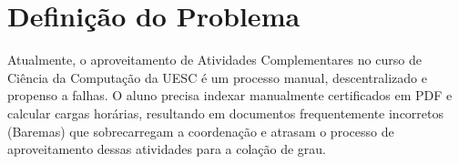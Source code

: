 \chapter{Definição do Problema}

Atualmente, o aproveitamento de Atividades Complementares no curso de Ciência da Computação da UESC é um processo manual, descentralizado e propenso a falhas. O aluno precisa indexar manualmente certificados em PDF e calcular cargas horárias, resultando em documentos frequentemente incorretos (Baremas) que sobrecarregam a coordenação e atrasam o processo de aproveitamento dessas atividades para a colação de grau.